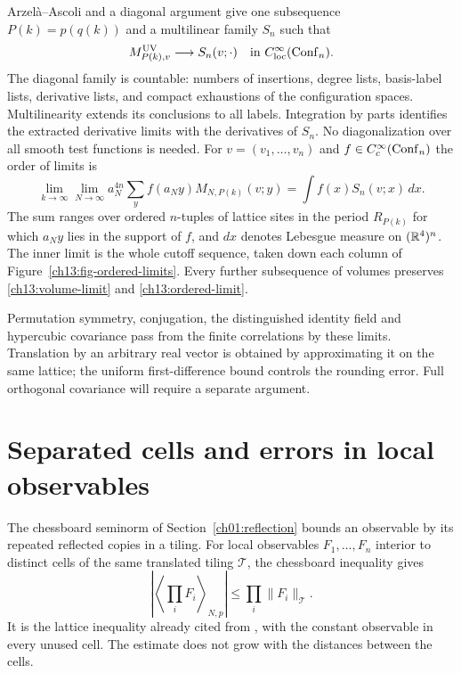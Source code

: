 Arzel\`a--Ascoli and a diagonal argument
\cite[Theorem~7.25]{Rudin1976} give one subsequence $P(k)=p(q(k))$
and a multilinear family $S_n$ such that
\begin{equation}
 M^{\rm UV}_{P(k),v}\longrightarrow S_n(v;\cdot)
                    \quad\hbox{in }C^\infty_{\rm loc}(\operatorname{Conf}_n).
 \label{ch13:volume-limit}
\end{equation}
The diagonal family is countable: numbers of insertions, degree lists, basis-label
lists, derivative lists, and compact exhaustions of the configuration
spaces. Multilinearity extends its conclusions to all labels.
Integration by parts identifies the extracted derivative limits with
the derivatives of $S_n$. No diagonalization over all smooth test functions is
needed. For $v=(v_1,\ldots,v_n)$ and $f\in C_c^\infty(\operatorname{Conf}_n)$ the order of limits is
\begin{equation}
 \lim_{k\to\infty}\lim_{N\to\infty}
 a_N^{4n}\sum_y f(a_Ny)M_{N,P(k)}(v;y)
                   =\int f(x)S_n(v;x)\,dx.
 \label{ch13:ordered-limit}
\end{equation}
The sum ranges over ordered $n$-tuples of lattice sites in the period
$R_{P(k)}$ for which $a_Ny$ lies in the support of $f$, and $dx$ denotes
Lebesgue measure on $(\mathbb R^4)^n$. The inner limit is the whole cutoff sequence, taken down each column
of Figure~\ref{ch13:fig-ordered-limits}. Every further subsequence of volumes
preserves \eqref{ch13:volume-limit} and
\eqref{ch13:ordered-limit}.



Permutation symmetry, conjugation, the distinguished identity field and
hypercubic covariance pass from the finite correlations by these
limits. Translation by an arbitrary real vector is obtained by
approximating it on the same lattice; the uniform first-difference
bound controls the rounding error. Full orthogonal covariance will
require a separate argument.

\section{Separated cells and errors in local observables}
\label{ch13:cells}

The chessboard seminorm of Section~\ref{ch01:reflection} bounds an
observable by its repeated reflected copies in a tiling. For local
observables $F_1,\ldots,F_n$ interior to distinct cells of the same
translated tiling $\mathcal T$, the chessboard inequality gives
\begin{equation}
 \left|\left\langle\prod_iF_i\right\rangle_{N,p}\right|
                   \le\prod_i\|F_i\|_{\mathcal T}.
 \label{ch13:chess}
\end{equation}
It is the lattice inequality already cited from
\cite{FrohlichIsraelLiebSimon1978}, with the constant observable in every unused cell.
The estimate does not grow with the distances between the cells.

